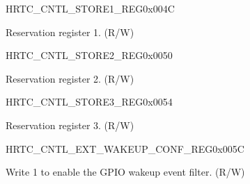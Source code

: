 \begin{register}{H}{RTC\_CNTL\_STORE1\_REG}{0x004C}\label{regdesc:RTCCNTLSTORE1REG}
%
\regnewline%
\begin{regdesc}\begin{reglist}
\label{fielddesc:RTCCNTLSCRATCH1}\item [RTC\_CNTL\_SCRATCH1] Reservation register 1. (R/W)
\end{reglist}\end{regdesc}
\end{register}


\begin{register}{H}{RTC\_CNTL\_STORE2\_REG}{0x0050}\label{regdesc:RTCCNTLSTORE2REG}
%
\regnewline%
\begin{regdesc}\begin{reglist}
\label{fielddesc:RTCCNTLSCRATCH2}\item [RTC\_CNTL\_SCRATCH2] Reservation register 2. (R/W)
\end{reglist}\end{regdesc}
\end{register}


\begin{register}{H}{RTC\_CNTL\_STORE3\_REG}{0x0054}\label{regdesc:RTCCNTLSTORE3REG}
%
\regnewline%
\begin{regdesc}\begin{reglist}
\label{fielddesc:RTCCNTLSCRATCH3}\item [RTC\_CNTL\_SCRATCH3] Reservation register 3. (R/W)
\end{reglist}\end{regdesc}
\end{register}


\begin{register}{H}{RTC\_CNTL\_EXT\_WAKEUP\_CONF\_REG}{0x005C}\label{regdesc:RTCCNTLEXTWAKEUPCONFREG}
%
%
\regnewline%
\begin{regdesc}\begin{reglist}
\label{fielddesc:RTCCNTLGPIOWAKEUPFILTER}\item [RTC\_CNTL\_GPIO\_WAKEUP\_FILTER] Write 1 to enable the GPIO wakeup event filter. (R/W)
\end{reglist}\end{regdesc}
\end{register}


